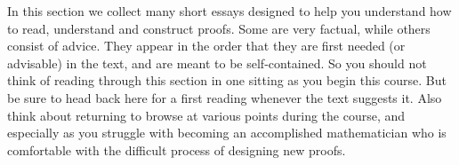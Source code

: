 %
In this section we collect many short essays designed to help you understand how to read, understand and construct proofs.  Some are very factual, while others consist of advice.  They appear in the order that they are first needed (or advisable) in the text, and are meant to be self-contained.  So you should not think of reading through this section in one sitting as you begin this course.  But be sure to head back here for a first reading whenever the text suggests it.  Also think about returning to browse at various points during the course, and especially as you struggle with becoming an accomplished mathematician who is comfortable with the difficult process of designing new proofs.
%
%
